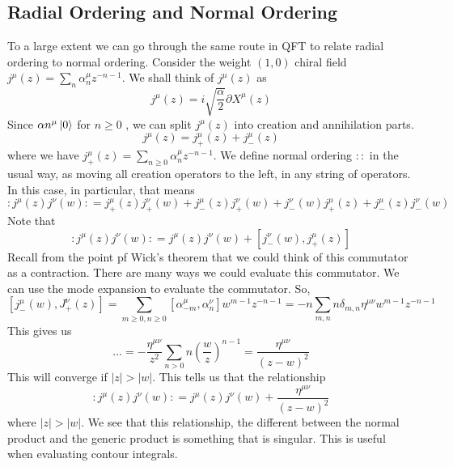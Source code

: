 \documentclass[11pt, oneside]{article}   	%
\theoremstyle{slanted}
\begin{document}
\subsection{Radial Ordering and Normal Ordering}
To a large extent 
we can go through the same route in 
QFT to relate radial ordering to normal ordering. 
Consider the weight $ \left( 1, 0  \right)  $ chiral 
field $ j ^ \mu \left(  z  \right)  = \sum _ n 
\alpha _ n ^ \mu z ^{ - n - 1 } $. 
We shall think of $ j ^ \mu \left(  z  \right)  $ 
as 
\[
 j ^ \mu \left( z  \right)   = i \sqrt{\frac{\alpha  }{  2  } } \partial  
 X ^ \mu \left(  z  \right) 
\] 
Since $ \alpha  n ^ \mu \ket{ 0 } $ for $ n \geq 0 $ , 
we can split $ j ^ \mu \left( z   \right)  $ into 
creation and annihilation parts. 
\[
	j ^ \mu \left(  z \right)   = j _ + ^ \mu (z) + 
	j _ - ^ \mu \left(  z  \right) 
\] where we have $ j _ + ^ \mu \left(  z  \right)  
 = \sum _{ n \geq 0 } \alpha _ n ^ \mu z ^{ - n - 1 } $. 
 We define normal ordering 
 $ :  : $ in the usual way, as moving 
 all creation operators to the left, 
 in any string of operators. In this case, 
 in particular, that means 
 \[
	 : j ^ \mu \left(  z  \right)  j ^ \nu \left(  w  \right)  : 
	  = j _ + ^ \mu \left( z  \right)  j _ + ^ \nu 
	  \left(  w  \right)  + j _ - ^{ \mu  } \left(  z  \right)  
	  j _ + ^{ \nu } \left(  w  \right)  
	  + j _ - ^ \nu \left(  w  \right)  j _ + ^ \mu \left(  z  \right)  
	  + j _ - ^ \mu \left(  z  \right)  j _ - ^ \nu \left(  w  \right) 
 \] Note that 
 \[
	 : j ^ \mu \left(  z  \right)  j ^ \nu \left(  w  \right)  : 
	 = j ^ \mu \left( z  \right)  j ^ \nu \left(  w  \right)  
	 + \left[  j _ - ^ \nu \left(  w  \right)  , 
	 j _ + ^{ \mu } \left(  z  \right)  \right]  
 \] Recall from the point pf Wick's theorem 
 that we could think of this commutator as a 
 contraction. 
 There are many ways we could evaluate this 
 commutator. We can 
 use the mode expansion to evaluate 
 the commutator. So, 
 \[
	 \left[  j _ - ^ \mu \left(  w  \right)  , 
	 J _ +^\nu  \left(  z   \right)  \right] 
	  = \sum_{ m \ge  0 , n \ge 0 } \left[  
	  \alpha _{ - m  } ^ \mu , \alpha _{ n  }^{ \nu } \right]  w 
	  ^{ m - 1  } z ^{ - n -  1} = - n \sum 
	  _{ m , n  } n \delta _{ m , n } \eta ^{ \mu \nu } w ^{ m - 1 } 
	  z ^{ - n -  1 }  
 \] This gives us 
 \[
  \dots =  - \frac{ \eta ^{ \mu \nu  } }{ z ^  2 } \sum _{ n > 0  }
  n \left( \frac{ w }{ z }  \right)  ^{ n - 1 } = \frac{\eta ^{ \mu \nu  } }{ 
  \left(  z -  w  \right)^ 2  }
 \] This will converge if $  | z | > | w |  $. 
 This tells us that 
 the relationship 
 \[
	 : j ^ \mu \left(  z  \right)  j ^ \nu \left(  w  \right)  : 
	 = j ^ \mu \left(  z  \right)  j ^ \nu \left(  w  \right)  
	 + \frac{ \eta ^{ \mu \nu  } }{ \left(  z - w  \right)  ^  2 } 
 \] where $ | z |  > | w |  $. 
 We see that this relationship, 
 the different between the normal product and 
 the generic product is something that is 
 singular. This is useful 
 when evaluating contour integrals. 
\end{document}

